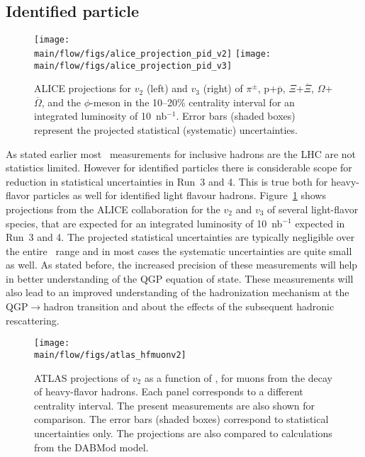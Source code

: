 \subsection{Identified particle \vn}\label{sec:identified_particle_vn}


\begin{figure}[!htb]
\begin{center}
\texttt{[image: \\main/flow/figs/alice\_projection\_pid\_v2]}
\texttt{[image: \\main/flow/figs/alice\_projection\_pid\_v3]}
\caption{
ALICE projections for $v_2$ (left) and $v_3$ (right) of $\pi^\pm$, 
  $\mathrm{p}$+$\overline{\mathrm{p}}$, $\Xi$+$\overline{\Xi}$, 
  $\Omega$+$\overline{\Omega}$, and the $\phi$-meson 
  in the 10--20\% centrality interval
  for an integrated luminosity of 10~nb$^{-1}$. 
Error bars (shaded boxes) represent the projected statistical 
  (systematic) uncertainties.}
\label{fig:alice_vn}
\end{center}
\end{figure}

As stated earlier most \vn\ measurements for inclusive hadrons are the LHC 
  are not statistics limited.
However for identified particles there is considerable scope for reduction 
  in statistical uncertainties in Run~3 and 4.
This is true both for heavy-flavor particles 
  as well for identified light flavour hadrons.
Figure~\ref{fig:alice_vn} shows projections from the ALICE collaboration for 
  the $v_2$ and $v_3$ of several light-flavor species, that are expected for 
  an integrated luminosity of 10~nb$^{-1}$ expected in Run~3 and 4.
The projected statistical uncertainties are typically negligible over the 
  entire \pt\ range and in most cases the systematic uncertainties are 
  quite small as well.
As stated before, the increased precision of these measurements will help in 
  better understanding of the QGP equation of state. 
These measurements will also lead to an improved understanding 
  of the hadronization mechanism at the QGP$\rightarrow$hadron transition
  and about the effects of the subsequent hadronic rescattering.


\begin{figure}[!htb]
\begin{center}
\texttt{[image: \\main/flow/figs/atlas\_hfmuonv2]}
\caption{
ATLAS projections of $v_2$ as a function of \pt, for muons from the decay of 
  heavy-flavor hadrons. 
Each panel corresponds to a different centrality interval. 
The present measurements are also shown for comparison. 
The error bars (shaded boxes) correspond to statistical uncertainties only. 
The projections are also compared to calculations from the DABMod model.}
\label{fig:atlas_hf_v2}
\end{center}
\end{figure}

